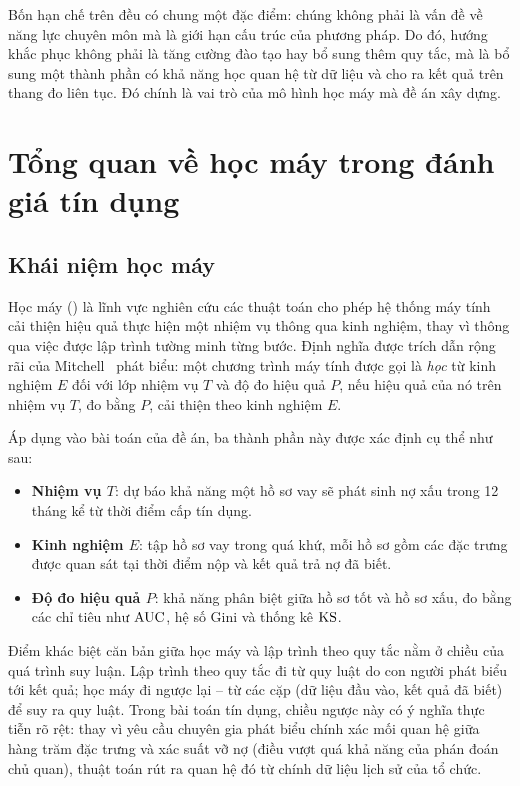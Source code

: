 Bốn hạn chế trên đều có chung một đặc điểm: chúng không phải là vấn đề về năng
lực chuyên môn mà là giới hạn cấu trúc của phương pháp. Do đó, hướng khắc phục
không phải là tăng cường đào tạo hay bổ sung thêm quy tắc, mà là bổ sung một
thành phần có khả năng học quan hệ từ dữ liệu và cho ra kết quả trên thang đo
liên tục. Đó chính là vai trò của mô hình học máy mà đề án xây
dựng.

\section{Tổng quan về học máy trong đánh giá tín dụng}
\label{sec:tong-quan-hoc-may}

\subsection{Khái niệm học máy}
\label{subsec:khai-niem-hoc-may}

Học máy () là lĩnh vực nghiên cứu các thuật toán cho phép
hệ thống máy tính cải thiện hiệu quả thực hiện một nhiệm vụ thông qua kinh
nghiệm, thay vì thông qua việc được lập trình tường minh từng bước. Định nghĩa
được trích dẫn rộng rãi của Mitchell~\cite{mitchell1997} phát biểu: một chương trình máy tính được
gọi là \textit{học} từ kinh nghiệm $E$ đối với lớp nhiệm vụ $T$ và độ đo hiệu quả
$P$, nếu hiệu quả của nó trên nhiệm vụ $T$, đo bằng $P$, cải thiện theo kinh
nghiệm $E$.

Áp dụng vào bài toán của đề án, ba thành phần này được xác định cụ thể như sau:

\begin{itemize}
  \item \textbf{Nhiệm vụ $T$}: dự báo khả năng một hồ sơ vay sẽ phát sinh nợ xấu
  trong 12 tháng kể từ thời điểm cấp tín dụng.
  \item \textbf{Kinh nghiệm $E$}: tập hồ sơ vay trong quá khứ, mỗi hồ sơ gồm các
  đặc trưng được quan sát tại thời điểm nộp và kết quả trả nợ đã biết.
  \item \textbf{Độ đo hiệu quả $P$}: khả năng phân biệt giữa hồ sơ tốt và hồ sơ
  xấu, đo bằng các chỉ tiêu như $\mathrm{AUC}$, hệ số Gini và thống kê $\mathrm{KS}$.
\end{itemize}

Điểm khác biệt căn bản giữa học máy và lập trình theo quy tắc nằm ở chiều của
quá trình suy luận. Lập trình theo quy tắc đi từ quy luật do con người phát biểu
tới kết quả; học máy đi ngược lại -- từ các cặp (dữ liệu đầu vào, kết quả đã
biết) để suy ra quy luật. Trong bài toán tín dụng, chiều ngược này có ý nghĩa
thực tiễn rõ rệt: thay vì yêu cầu chuyên gia phát biểu chính xác mối quan hệ giữa
hàng trăm đặc trưng và xác suất vỡ nợ (điều vượt quá khả năng của phán đoán chủ
quan), thuật toán rút ra quan hệ đó từ chính dữ liệu lịch sử của tổ chức.

